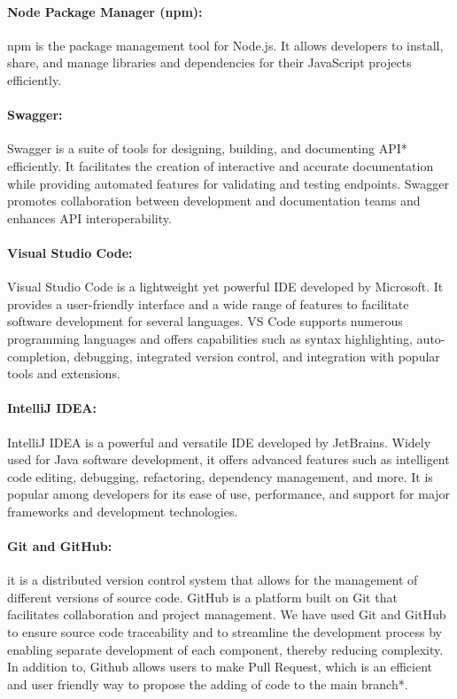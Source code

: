 \documentclass[12pt,a4paper,table,english]{article}
\begin{document}
	\paragraph{Node Package Manager (npm):} npm is the package management tool for Node.js. It allows developers to install, share, and manage libraries and dependencies for their JavaScript projects efficiently. 
	
	\paragraph{Swagger:} Swagger is a suite of tools for designing, building, and documenting API* efficiently. It facilitates the creation of interactive and accurate documentation while providing automated features for validating and testing endpoints. Swagger promotes collaboration between development and documentation teams and enhances API interoperability.
	
	
	\paragraph{Visual Studio Code:} Visual Studio Code is a lightweight yet powerful IDE developed by Microsoft. It provides a user-friendly interface and a wide range of features to facilitate software development for several languages. VS Code supports numerous programming languages and offers capabilities such as syntax highlighting, auto-completion, debugging, integrated version control, and integration with popular tools and extensions.
	
	\paragraph{IntelliJ IDEA:} IntelliJ IDEA is a powerful and versatile IDE developed by JetBrains. Widely used for Java software development, it offers advanced features such as intelligent code editing, debugging, refactoring, dependency management, and more. It is popular among developers for its ease of use, performance, and support for major frameworks and development technologies.
	
	
	\paragraph{Git and GitHub:} it is a distributed version control system that allows for the management of different versions of source code. GitHub is a platform built on Git that facilitates collaboration and project management. We have used Git and GitHub to ensure source code traceability and to streamline the development process by enabling separate development of each component, thereby reducing complexity. In addition to, Github allows users to make Pull Request, which is an efficient and user friendly way to propose the adding of code to the main branch*. 
	
\end{document}
